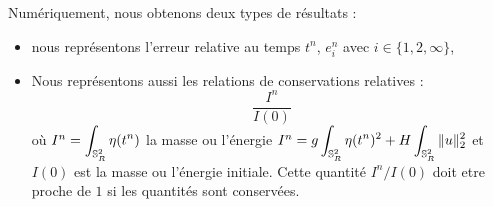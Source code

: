 Numériquement, nous obtenons deux types de résultats :
\begin{itemize}
\item nous représentons l'erreur relative au temps $t^n$, $e_i^n$ avec $i \in \lbrace 1, 2, \infty \rbrace$,
\item Nous représentons aussi les relations de conservations relatives :
\begin{equation}
\dfrac{I^n}{I(0)}
\end{equation}
où  $I^n = \displaystyle\int_{\mathbb{S}_R^2} \eta (t^n)$ la masse ou l'énergie $I^n = g \displaystyle\int_{\mathbb{S}_R^2} \eta (t^n)^2 + H \displaystyle\int_{\mathbb{S}_R^2} \|u \|_2^2$ et $I(0)$ est la masse ou l'énergie initiale. Cette quantité $I^n/I(0)$ doit etre proche de $1$ si les quantités sont conservées.
\end{itemize} 


